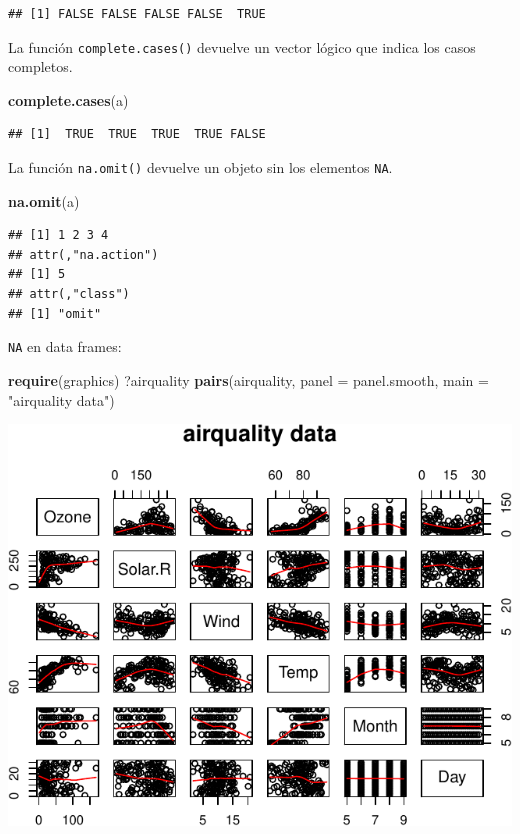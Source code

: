 \documentclass[]{article}
\newenvironment{Shaded}{\begin{snugshade}}{\end{snugshade}}
\newcommand{\KeywordTok}[1]{\textcolor[rgb]{0.13,0.29,0.53}{\textbf{{#1}}}}
\newcommand{\DataTypeTok}[1]{\textcolor[rgb]{0.13,0.29,0.53}{{#1}}}
\newcommand{\StringTok}[1]{\textcolor[rgb]{0.31,0.60,0.02}{{#1}}}
\newcommand{\NormalTok}[1]{{#1}}
\numberwithin{equation}{section}
\begin{document}
\begin{verbatim}
## [1] FALSE FALSE FALSE FALSE  TRUE
\end{verbatim}

La función \texttt{complete.cases()} devuelve un vector lógico que
indica los casos completos.

\begin{Shaded}
\begin{Highlighting}[]
\KeywordTok{complete.cases}\NormalTok{(a)}
\end{Highlighting}
\end{Shaded}

\begin{verbatim}
## [1]  TRUE  TRUE  TRUE  TRUE FALSE
\end{verbatim}

La función \texttt{na.omit()} devuelve un objeto sin los elementos
\texttt{NA}.

\begin{Shaded}
\begin{Highlighting}[]
\KeywordTok{na.omit}\NormalTok{(a) }
\end{Highlighting}
\end{Shaded}

\begin{verbatim}
## [1] 1 2 3 4
## attr(,"na.action")
## [1] 5
## attr(,"class")
## [1] "omit"
\end{verbatim}

\texttt{NA} en data frames:

\begin{Shaded}
\begin{Highlighting}[]
\KeywordTok{require}\NormalTok{(graphics)}
\NormalTok{?airquality}
\KeywordTok{pairs}\NormalTok{(airquality, }\DataTypeTok{panel =} \NormalTok{panel.smooth, }\DataTypeTok{main =} \StringTok{"airquality data"}\NormalTok{)}
\end{Highlighting}
\end{Shaded}

\includegraphics{tema1_files/figure-latex/unnamed-chunk-56-1.pdf}
\end{document}
